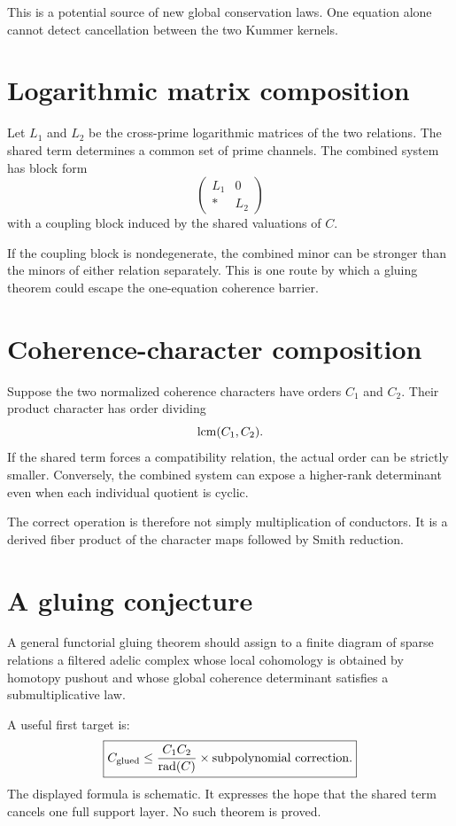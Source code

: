 This is a potential source of new global conservation laws. One equation alone cannot detect cancellation between the two Kummer kernels.

\section{Logarithmic matrix composition}
Let $L_1$ and $L_2$ be the cross-prime logarithmic matrices of the two relations. The shared term determines a common set of prime channels. The combined system has block form
\[
 \begin{pmatrix}
 L_1&0\\
 *&L_2
 \end{pmatrix}
\]
with a coupling block induced by the shared valuations of $C$.

If the coupling block is nondegenerate, the combined minor can be stronger than the minors of either relation separately. This is one route by which a gluing theorem could escape the one-equation coherence barrier.

\section{Coherence-character composition}
Suppose the two normalized coherence characters have orders $C_1$ and $C_2$. Their product character has order dividing
\[
 \operatorname{lcm}(C_1,C_2).
\]
If the shared term forces a compatibility relation, the actual order can be strictly smaller. Conversely, the combined system can expose a higher-rank determinant even when each individual quotient is cyclic.

The correct operation is therefore not simply multiplication of conductors. It is a derived fiber product of the character maps followed by Smith reduction.

\section{A gluing conjecture}
A general functorial gluing theorem should assign to a finite diagram of sparse relations a filtered adelic complex whose local cohomology is obtained by homotopy pushout and whose global coherence determinant satisfies a submultiplicative law.

A useful first target is:
\[
 \boxed{
 C_{\mathrm{glued}}
 \le
 \frac{C_1C_2}{\operatorname{rad}(C)}
 \times
 \text{subpolynomial correction}.
 }
\]
The displayed formula is schematic. It expresses the hope that the shared term cancels one full support layer. No such theorem is proved.

